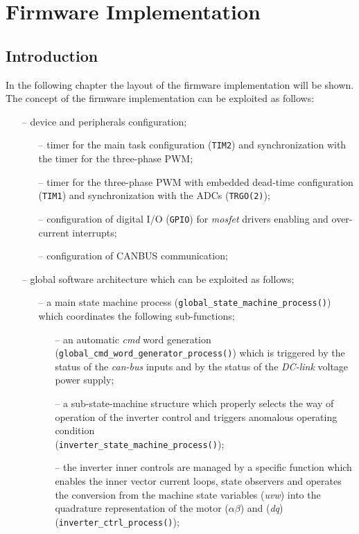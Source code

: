 \documentclass[11pt,a4paper,oneside]{book}
\numberwithin{equation}{section}
\theoremstyle{it}
\theoremstyle{definition}
\begin{document}
\chapter{Firmware Implementation}
\section{Introduction}
In the following chapter the layout of the firmware implementation will be shown. The concept of the firmware implementation can be exploited as follows:
\begin{itemize}
	\item[--] device and peripherals configuration;
	\begin{itemize}
		\item[--] timer for the main task configuration ({\selectfont \verb+TIM2+}) and synchronization with the timer for the three-phase PWM;
		\item[--] timer for the three-phase PWM with embedded dead-time configuration ({\selectfont \verb+TIM1+}) and synchronization with the ADCs ({\selectfont \verb+TRGO(2)+});
		\item[--] configuration of digital I/O ({\selectfont \verb+GPIO+}) for \textit{mosfet} drivers enabling and over-current interrupts;
		\item[--] configuration of CANBUS communication;
	\end{itemize}
	\item[--] global software architecture which can be exploited as follows;
	\begin{itemize}
			\item[--] a main state machine process ({\selectfont \verb+global_state_machine_process()+}) which coordinates the following sub-functions;
			\begin{itemize}
				\item[--] an automatic \textit{cmd} word generation ({\selectfont \verb+global_cmd_word_generator_process()+}) which is triggered by the status of the \textit{can-bus} inputs and by the status of the \textit{DC-link} voltage power supply;
				\item[--] a sub-state-machine structure which properly selects the way of operation of the inverter control and triggers anomalous operating condition \\ ({\selectfont \verb+inverter_state_machine_process()+});
				\item[--] the inverter inner controls are managed by a specific function which enables the inner vector current loops, state observers and operates the conversion from the machine state variables (\textit{uvw}) into the quadrature representation of the motor ($\alpha\beta$) and (\textit{dq}) ({\selectfont \verb+inverter_ctrl_process()+});

\end{itemize}
\end{itemize}
\end{itemize}
\end{document}
